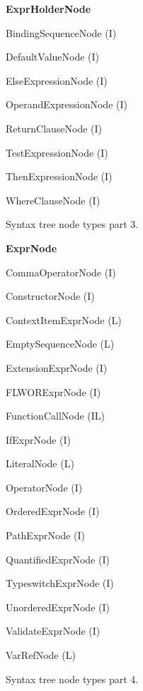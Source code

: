 \begin{figure}
\caption{Syntax tree node types part 3.}
\label{FIG_syntax_tree_node_types_part_3}
\begin{description}
\item \textbf{ExprHolderNode}
  \begin{description}
  \item BindingSequenceNode (I)
  \item DefaultValueNode (I)
  \item ElseExpressionNode (I)
  \item OperandExpressionNode (I)
  \item ReturnClauseNode (I)
  \item TestExpressionNode (I)
  \item ThenExpressionNode (I)
  \item WhereClauseNode (I)
  \end{description}
\end{description}
\end{figure}

\begin{figure}
\caption{Syntax tree node types part 4.}
\label{FIG_syntax_tree_node_types_part_4}
\begin{description}
\item \textbf{ExprNode}
  \begin{description}
  \item CommaOperatorNode (I)
  \item ConstructorNode (I)
  \item ContextItemExprNode (L)
  \item EmptySequenceNode (L)
  \item ExtensionExprNode (I)
  \item FLWORExprNode (I)
  \item FunctionCallNode (IL)
  \item IfExprNode (I)
  \item LiteralNode (L)
  \item OperatorNode (I)
  \item OrderedExprNode (I)
  \item PathExprNode (I)
  \item QuantifiedExprNode (I)
  \item TypeswitchExprNode (I)
  \item UnorderedExprNode (I)
  \item ValidateExprNode (I)
  \item VarRefNode (L)
  \end{description}
\end{description}
\end{figure}

